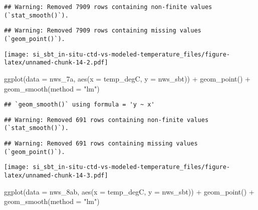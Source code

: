 \documentclass[
]{article}
\newenvironment{Shaded}{\begin{snugshade}}{\end{snugshade}}
\newcommand{\AttributeTok}[1]{\textcolor[rgb]{0.77,0.63,0.00}{#1}}
\newcommand{\FunctionTok}[1]{\textcolor[rgb]{0.00,0.00,0.00}{#1}}
\newcommand{\NormalTok}[1]{#1}
\newcommand{\SpecialCharTok}[1]{\textcolor[rgb]{0.00,0.00,0.00}{#1}}
\newcommand{\StringTok}[1]{\textcolor[rgb]{0.31,0.60,0.02}{#1}}
\begin{document}
\begin{verbatim}
## Warning: Removed 7909 rows containing non-finite values (`stat_smooth()`).
\end{verbatim}

\begin{verbatim}
## Warning: Removed 7909 rows containing missing values (`geom_point()`).
\end{verbatim}

\texttt{[image: si\_sbt\_in-situ-ctd-vs-modeled-temperature\_files/figure-latex/unnamed-chunk-14-2.pdf]}

\begin{Shaded}
\begin{Highlighting}[]
\FunctionTok{ggplot}\NormalTok{(}\AttributeTok{data =}\NormalTok{ nws\_7a, }\FunctionTok{aes}\NormalTok{(}\AttributeTok{x =}\NormalTok{ temp\_degC, }\AttributeTok{y =}\NormalTok{ nws\_sbt)) }\SpecialCharTok{+} \FunctionTok{geom\_point}\NormalTok{() }\SpecialCharTok{+} \FunctionTok{geom\_smooth}\NormalTok{(}\AttributeTok{method =} \StringTok{"lm"}\NormalTok{)}
\end{Highlighting}
\end{Shaded}

\begin{verbatim}
## `geom_smooth()` using formula = 'y ~ x'
\end{verbatim}

\begin{verbatim}
## Warning: Removed 691 rows containing non-finite values (`stat_smooth()`).
\end{verbatim}

\begin{verbatim}
## Warning: Removed 691 rows containing missing values (`geom_point()`).
\end{verbatim}

\texttt{[image: si\_sbt\_in-situ-ctd-vs-modeled-temperature\_files/figure-latex/unnamed-chunk-14-3.pdf]}

\begin{Shaded}
\begin{Highlighting}[]
\FunctionTok{ggplot}\NormalTok{(}\AttributeTok{data =}\NormalTok{ nws\_8ab, }\FunctionTok{aes}\NormalTok{(}\AttributeTok{x =}\NormalTok{ temp\_degC, }\AttributeTok{y =}\NormalTok{ nws\_sbt)) }\SpecialCharTok{+} \FunctionTok{geom\_point}\NormalTok{() }\SpecialCharTok{+} \FunctionTok{geom\_smooth}\NormalTok{(}\AttributeTok{method =} \StringTok{"lm"}\NormalTok{)}
\end{Highlighting}
\end{Shaded}
\end{document}
